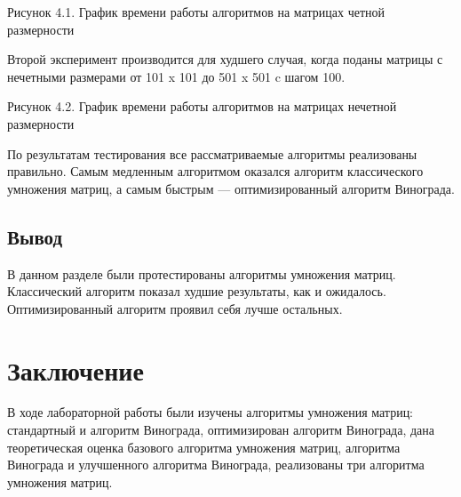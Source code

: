 \documentclass[12pt]{report}
\begin{document}
\begin{center}
  	Рисунок 4.1. График времени работы алгоритмов на матрицах четной размерности
	\end{center}
	
Второй эксперимент производится для худшего случая, когда поданы матрицы с нечетными размерами от 101 x 101 до 501 x 501 c шагом 100. \\



\begin{center}
  	Рисунок 4.2. График времени работы алгоритмов на матрицах нечетной размерности
	\end{center}


\par
По результатам тестирования все рассматриваемые алгоритмы реализованы правильно. Самым медленным алгоритмом оказался алгоритм классического умножения матриц, а самым быстрым — оптимизированный алгоритм Винограда.


\section{Вывод}
В данном разделе были протестированы алгоритмы умножения матриц. Классический алгоритм 
показал худшие результаты, как и ожидалось. Оптимизированный алгоритм проявил себя лучше остальных.

\chapter*{Заключение}
В ходе лабораторной работы были изучены алгоритмы умножения матриц: стандартный и алгоритм Винограда, оптимизирован алгоритм Винограда, дана теоретическая оценка базового алгоритма умножения матриц, алгоритма Винограда и улучшенного алгоритма Винограда, реализованы три алгоритма умножения матриц.
\end{document}
